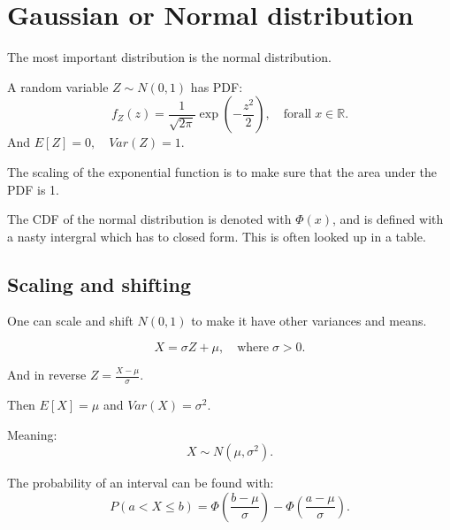\section{Gaussian or Normal distribution}

The most important distribution is the normal distribution.

\begin{definition}
    A random variable $Z \sim N(0, 1)$ has PDF: \[
        f_Z(z) = \frac{1}{\sqrt{2 \pi}} \exp\left( - \frac{z^{2}}{2} \right), \quad \mathrm{for all} \; x \in \mathbb{R}
    .\] 
    And $E[Z] = 0, \quad Var(Z) = 1$.
\end{definition}

The scaling of the exponential function is to make sure that the area under the PDF is 1.

The CDF of the normal distribution is denoted with $\Phi(x)$, and is defined with a nasty intergral which has to closed form.
This is often looked up in a table.

\subsection{Scaling and shifting}

One can scale and shift $N(0, 1)$ to make it have other variances and means.

\[
    X = \sigma Z + \mu, \quad \mathrm{where} \; \sigma > 0
.\] 

And in reverse $Z = \frac{X- \mu}{\sigma}$.

Then $E[X] = \mu$ and $Var(X) = \sigma^{2}$.

Meaning: \[
    X \sim N(\mu, \sigma^{2})
.\] 

The probability of an interval can be found with: \[
    P(a < X \leq b) = \Phi\left(\frac{b - \mu}{\sigma}\right) - \Phi\left(\frac{a-\mu}{\sigma}\right)
.\] 
